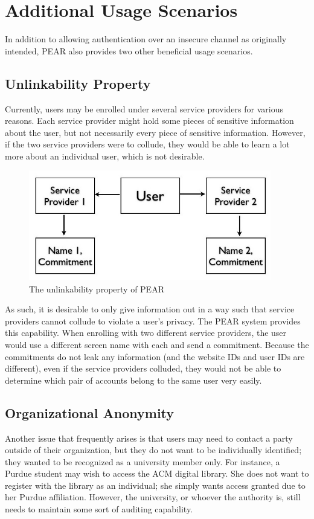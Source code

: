 \section{Additional Usage Scenarios}
In addition to allowing authentication over an insecure channel as originally intended, PEAR also provides two other
beneficial usage scenarios.

\subsection{Unlinkability Property}
Currently, users may be enrolled under several service providers for various reasons. Each service provider might
hold some pieces of sensitive information about the user, but not necessarily every piece of sensitive information.
However, if the two service providers were to collude, they would be able to learn a lot more about an individual
user, which is not desirable.

\begin{figure}[!ht]
\centering
\includegraphics[width=400px]{images/pearpics.jpg}
\caption{The unlinkability property of PEAR}
\label{fig:pearunlinkability}
\vspace{-25pt}
\end{figure}
\FloatBarrier

As such, it is desirable to only give information out in a way such that service providers cannot collude to violate
a user's privacy. The PEAR system provides this capability. When enrolling with two different service providers,
the user would use a different screen name with each and send a commitment. Because the commitments do not
leak any information (and the website IDs and user IDs are different), even if the service providers colluded, they would
not be able to determine which pair of accounts belong to the same user very easily.

\subsection{Organizational Anonymity}
Another issue that frequently arises is that users may need to contact a party outside of their organization, but
they do not want to be individually identified; they wanted to be recognized as a university member only. For instance,
a Purdue student may wish to access the ACM digital library. She does not want to register with the library as an
individual; she simply wants access granted due to her Purdue affiliation.
However, the university, or whoever the authority is, still needs to maintain some sort of auditing capability.

